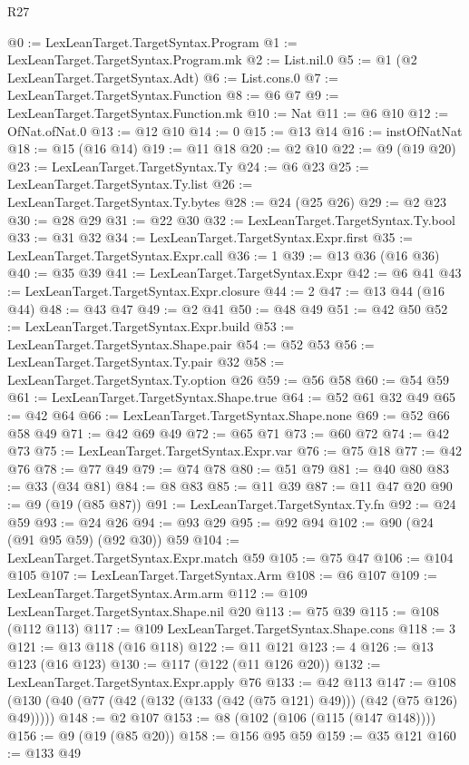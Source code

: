 \begin{lexlean}{R27}
\begin{coremodule}
{{{{{{{{{{{@0 := LexLeanTarget.TargetSyntax.Program
@1 := LexLeanTarget.TargetSyntax.Program.mk
@2 := List.nil.{0}
@5 := @1 (@2 LexLeanTarget.TargetSyntax.Adt)
@6 := List.cons.{0}
@7 := LexLeanTarget.TargetSyntax.Function
@8 := @6 @7
@9 := LexLeanTarget.TargetSyntax.Function.mk
@10 := Nat
@11 := @6 @10
@12 := OfNat.ofNat.{0}
@13 := @12 @10
@14 := 0
@15 := @13 @14
@16 := instOfNatNat
@18 := @15 (@16 @14)
@19 := @11 @18
@20 := @2 @10
@22 := @9 (@19 @20)
@23 := LexLeanTarget.TargetSyntax.Ty
@24 := @6 @23
@25 := LexLeanTarget.TargetSyntax.Ty.list
@26 := LexLeanTarget.TargetSyntax.Ty.bytes
@28 := @24 (@25 @26)
@29 := @2 @23
@30 := @28 @29
@31 := @22 @30
@32 := LexLeanTarget.TargetSyntax.Ty.bool
@33 := @31 @32
@34 := LexLeanTarget.TargetSyntax.Expr.first
@35 := LexLeanTarget.TargetSyntax.Expr.call
@36 := 1
@39 := @13 @36 (@16 @36)
@40 := @35 @39
@41 := LexLeanTarget.TargetSyntax.Expr
@42 := @6 @41
@43 := LexLeanTarget.TargetSyntax.Expr.closure
@44 := 2
@47 := @13 @44 (@16 @44)
@48 := @43 @47
@49 := @2 @41
@50 := @48 @49
@51 := @42 @50
@52 := LexLeanTarget.TargetSyntax.Expr.build
@53 := LexLeanTarget.TargetSyntax.Shape.pair
@54 := @52 @53
@56 := LexLeanTarget.TargetSyntax.Ty.pair @32
@58 := LexLeanTarget.TargetSyntax.Ty.option @26
@59 := @56 @58
@60 := @54 @59
@61 := LexLeanTarget.TargetSyntax.Shape.true
@64 := @52 @61 @32 @49
@65 := @42 @64
@66 := LexLeanTarget.TargetSyntax.Shape.none
@69 := @52 @66 @58 @49
@71 := @42 @69 @49
@72 := @65 @71
@73 := @60 @72
@74 := @42 @73
@75 := LexLeanTarget.TargetSyntax.Expr.var
@76 := @75 @18
@77 := @42 @76
@78 := @77 @49
@79 := @74 @78
@80 := @51 @79
@81 := @40 @80
@83 := @33 (@34 @81)
@84 := @8 @83
@85 := @11 @39
@87 := @11 @47 @20
@90 := @9 (@19 (@85 @87))
@91 := LexLeanTarget.TargetSyntax.Ty.fn
@92 := @24 @59
@93 := @24 @26
@94 := @93 @29
@95 := @92 @94
@102 := @90 (@24 (@91 @95 @59) (@92 @30)) @59
@104 := LexLeanTarget.TargetSyntax.Expr.match @59
@105 := @75 @47
@106 := @104 @105
@107 := LexLeanTarget.TargetSyntax.Arm
@108 := @6 @107
@109 := LexLeanTarget.TargetSyntax.Arm.arm
@112 := @109 LexLeanTarget.TargetSyntax.Shape.nil @20
@113 := @75 @39
@115 := @108 (@112 @113)
@117 := @109 LexLeanTarget.TargetSyntax.Shape.cons
@118 := 3
@121 := @13 @118 (@16 @118)
@122 := @11 @121
@123 := 4
@126 := @13 @123 (@16 @123)
@130 := @117 (@122 (@11 @126 @20))
@132 := LexLeanTarget.TargetSyntax.Expr.apply @76
@133 := @42 @113
@147 := @108 (@130 (@40 (@77 (@42 (@132 (@133 (@42 (@75 @121) @49))) (@42 (@75 @126) @49)))))
@148 := @2 @107
@153 := @8 (@102 (@106 (@115 (@147 @148))))
@156 := @9 (@19 (@85 @20))
@158 := @156 @95 @59
@159 := @35 @121
@160 := @133 @49
}}}}}}}}}}}
\end{coremodule}
\end{lexlean}
